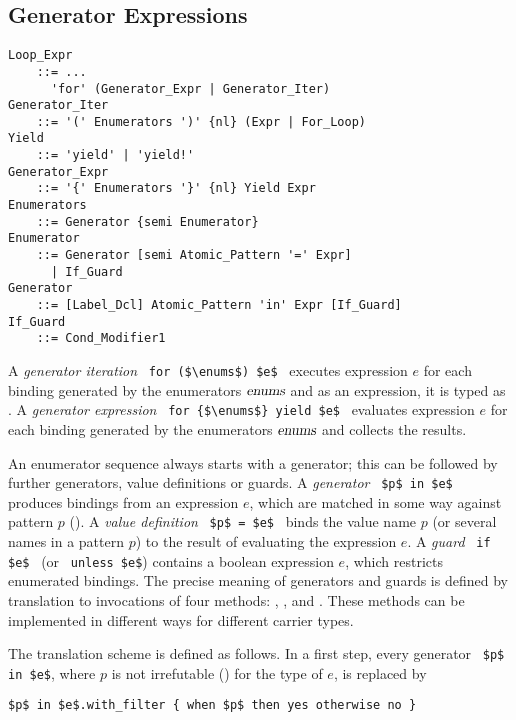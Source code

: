 \subsection{Generator Expressions}
\label{sec:generator-expressions}

\grammar\begin{lstlisting}
Loop_Expr
    ::= ...
      'for' (Generator_Expr | Generator_Iter)
Generator_Iter 
    ::= '(' Enumerators ')' {nl} (Expr | For_Loop)
Yield 
    ::= 'yield' | 'yield!'
Generator_Expr 
    ::= '{' Enumerators '}' {nl} Yield Expr
Enumerators
    ::= Generator {semi Enumerator}
Enumerator
    ::= Generator [semi Atomic_Pattern '=' Expr]
      | If_Guard
Generator 
    ::= [Label_Dcl] Atomic_Pattern 'in' Expr [If_Guard]
If_Guard 
    ::= Cond_Modifier1
\end{lstlisting}

A {\em generator iteration} ~\lstinline!for ($\enums$) $e$!~ executes expression $e$ for each binding generated by the enumerators $\mbox{\sl enums}$ and as an expression, it is typed as . A {\em generator expression} ~\lstinline!for {$\enums$} yield $e$!~ evaluates expression $e$ for each binding generated by the enumerators $\mbox{\sl enums}$ and collects the results.

An enumerator sequence always starts with a generator; this can be followed by further generators, value definitions or guards. A {\em generator} ~\lstinline!$p$ in $e$!~ produces bindings from an expression $e$, which are matched in some way against pattern $p$ (). A {\em value definition} ~\lstinline!$p$ = $e$!~ binds the value name $p$ (or several names in a pattern $p$) to the result of evaluating the expression $e$. A {\em guard} ~\lstinline!if $e$!~ (or ~\lstinline!unless $e$!) contains a boolean expression $e$, which restricts enumerated bindings. The precise meaning of generators and guards is defined by translation to invocations of four methods: , ,  and . These methods can be implemented in different ways for different carrier types.

The translation scheme is defined as follows. In a first step, every generator ~\lstinline!$p$ in $e$!, where $p$ is not irrefutable () for the type of $e$, is replaced by 
\begin{lstlisting}
$p$ in $e$.with_filter { when $p$ then yes otherwise no }
\end{lstlisting}

